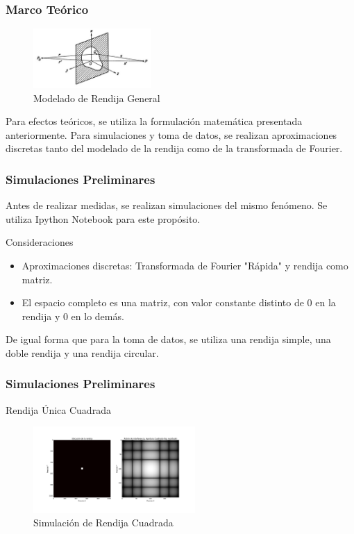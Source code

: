 \documentclass[12pt]{beamer}
\begin{document}
\begin{frame}
\frametitle{Marco Teórico}
\begin{block}{}
\begin{figure}[H]
\centering
\includegraphics[width=0.4\textwidth]{Diagrama.png}
\caption{Modelado de Rendija General} \label{fig:rejilla}
\end{figure}
\end{block}
Para efectos teóricos, se utiliza la formulación matemática presentada anteriormente. Para simulaciones y toma de datos, se realizan aproximaciones discretas tanto del modelado de la rendija como de la transformada de Fourier.
\end{frame}

\begin{frame}
\frametitle{Simulaciones Preliminares}
Antes de realizar medidas, se realizan simulaciones del mismo fenómeno. Se utiliza Ipython Notebook para este propósito.
\begin{block}{Consideraciones}
\begin{itemize}
\item Aproximaciones discretas: Transformada de Fourier "Rápida" y rendija como matriz.
\item El espacio completo es una matriz, con valor constante distinto de 0 en la rendija y 0 en lo demás.
\end{itemize}
\end{block}
De igual forma que para la toma de datos, se utiliza una rendija simple, una doble rendija y una rendija circular.
\end{frame}

\begin{frame}
\frametitle{Simulaciones Preliminares}
\begin{block}{Rendija Única Cuadrada}
\begin{figure}[H]
\centering
\includegraphics[width=0.55\textwidth]{Cuadrado.png}
\caption{Simulación de Rendija Cuadrada} \label{fig:rejillaCuad}
\end{figure}
\end{block}
\end{frame}
\end{document}
